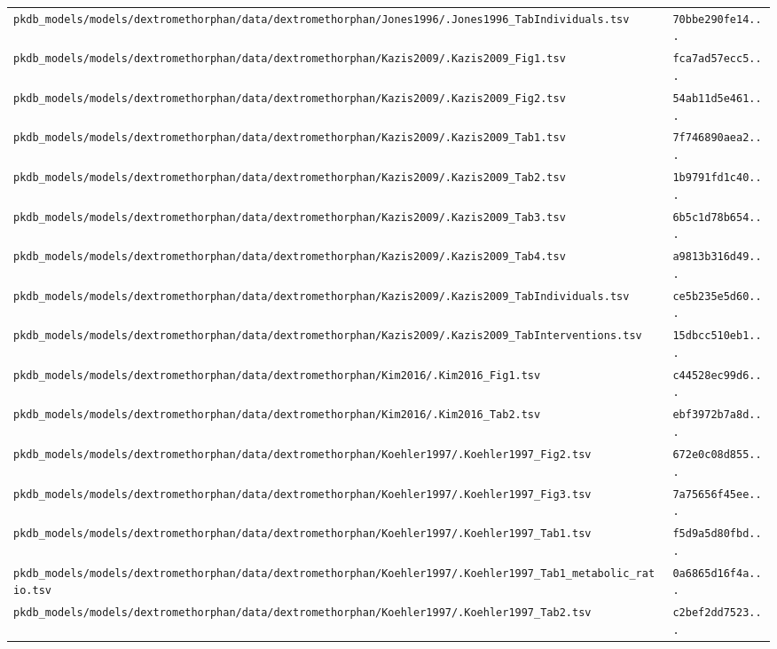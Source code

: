 \documentclass{article}
\begin{document}
\begin{longtable}{ll}
\texttt{pkdb\_models/models/dextromethorphan/data/dextromethorphan/Jones1996/.Jones1996\_TabIndividuals.tsv} & \texttt{70bbe290fe14...} \\
\texttt{pkdb\_models/models/dextromethorphan/data/dextromethorphan/Kazis2009/.Kazis2009\_Fig1.tsv} & \texttt{fca7ad57ecc5...} \\
\texttt{pkdb\_models/models/dextromethorphan/data/dextromethorphan/Kazis2009/.Kazis2009\_Fig2.tsv} & \texttt{54ab11d5e461...} \\
\texttt{pkdb\_models/models/dextromethorphan/data/dextromethorphan/Kazis2009/.Kazis2009\_Tab1.tsv} & \texttt{7f746890aea2...} \\
\texttt{pkdb\_models/models/dextromethorphan/data/dextromethorphan/Kazis2009/.Kazis2009\_Tab2.tsv} & \texttt{1b9791fd1c40...} \\
\texttt{pkdb\_models/models/dextromethorphan/data/dextromethorphan/Kazis2009/.Kazis2009\_Tab3.tsv} & \texttt{6b5c1d78b654...} \\
\texttt{pkdb\_models/models/dextromethorphan/data/dextromethorphan/Kazis2009/.Kazis2009\_Tab4.tsv} & \texttt{a9813b316d49...} \\
\texttt{pkdb\_models/models/dextromethorphan/data/dextromethorphan/Kazis2009/.Kazis2009\_TabIndividuals.tsv} & \texttt{ce5b235e5d60...} \\
\texttt{pkdb\_models/models/dextromethorphan/data/dextromethorphan/Kazis2009/.Kazis2009\_TabInterventions.tsv} & \texttt{15dbcc510eb1...} \\
\texttt{pkdb\_models/models/dextromethorphan/data/dextromethorphan/Kim2016/.Kim2016\_Fig1.tsv} & \texttt{c44528ec99d6...} \\
\texttt{pkdb\_models/models/dextromethorphan/data/dextromethorphan/Kim2016/.Kim2016\_Tab2.tsv} & \texttt{ebf3972b7a8d...} \\
\texttt{pkdb\_models/models/dextromethorphan/data/dextromethorphan/Koehler1997/.Koehler1997\_Fig2.tsv} & \texttt{672e0c08d855...} \\
\texttt{pkdb\_models/models/dextromethorphan/data/dextromethorphan/Koehler1997/.Koehler1997\_Fig3.tsv} & \texttt{7a75656f45ee...} \\
\texttt{pkdb\_models/models/dextromethorphan/data/dextromethorphan/Koehler1997/.Koehler1997\_Tab1.tsv} & \texttt{f5d9a5d80fbd...} \\
\texttt{pkdb\_models/models/dextromethorphan/data/dextromethorphan/Koehler1997/.Koehler1997\_Tab1\_metabolic\_ratio.tsv} & \texttt{0a6865d16f4a...} \\
\texttt{pkdb\_models/models/dextromethorphan/data/dextromethorphan/Koehler1997/.Koehler1997\_Tab2.tsv} & \texttt{c2bef2dd7523...} \\

\end{longtable}
\end{document}
